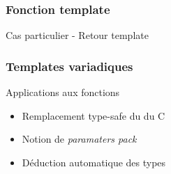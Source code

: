 \documentclass[svgnames]{beamer}
\begin{document}
\frame
{
  \frametitle{Fonction template}
  \begin{block}{Cas particulier - Retour template}
  \lsttmpreturn
  \end{block}
}
\frame
{
  \frametitle{Templates variadiques}
  \begin{block}{Applications aux fonctions}
  \begin{itemize}
  \item Remplacement type-safe du  du C
  \item Notion de \textit{paramaters pack}
  \item Déduction automatique des types
  \end{itemize}
  
  \end{block}{}
}
\end{document}
